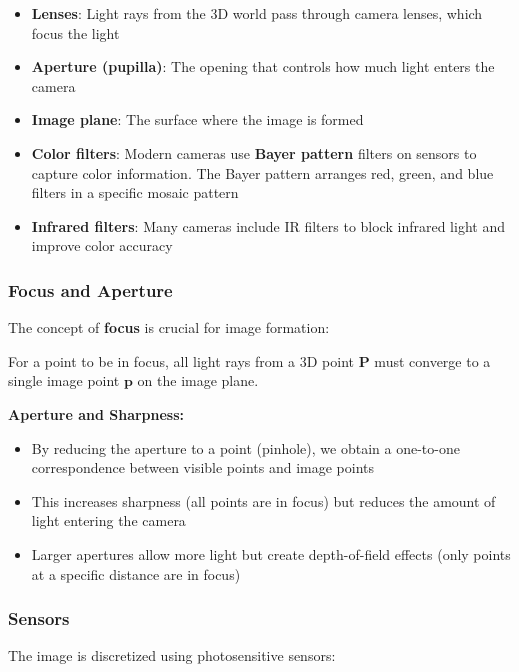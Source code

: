 \documentclass[11pt,a4paper]{article}
\theoremstyle{definition}
\theoremstyle{plain}
\theoremstyle{remark}
\begin{document}
\begin{itemize}
    \item \textbf{Lenses}: Light rays from the 3D world pass through camera lenses, which focus the light
    \item \textbf{Aperture (pupilla)}: The opening that controls how much light enters the camera
    \item \textbf{Image plane}: The surface where the image is formed
    \item \textbf{Color filters}: Modern cameras use \textbf{Bayer pattern} filters on sensors to capture color information. The Bayer pattern arranges red, green, and blue filters in a specific mosaic pattern
    \item \textbf{Infrared filters}: Many cameras include IR filters to block infrared light and improve color accuracy
\end{itemize}

\subsubsection{Focus and Aperture}

The concept of \textbf{focus} is crucial for image formation:

\begin{tcolorbox}[colback=green!5!white,colframe=green!75!black,title=\textbf{Point in Focus}]
For a point to be in focus, all light rays from a 3D point $\mathbf{P}$ must converge to a single image point $\mathbf{p}$ on the image plane.
\end{tcolorbox}

\textbf{Aperture and Sharpness:}
\begin{itemize}
    \item By reducing the aperture to a point (pinhole), we obtain a one-to-one correspondence between visible points and image points
    \item This increases sharpness (all points are in focus) but reduces the amount of light entering the camera
    \item Larger apertures allow more light but create depth-of-field effects (only points at a specific distance are in focus)
\end{itemize}

\subsubsection{Sensors}

The image is discretized using photosensitive sensors:
\end{document}
